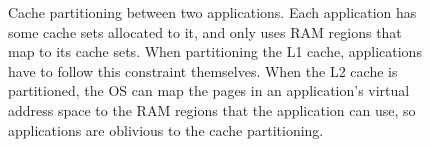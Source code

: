 \begin{figure}[hbt]
  \caption{
    Cache partitioning between two applications. Each application has some
    cache sets allocated to it, and only uses RAM regions that map to its cache
    sets. When partitioning the L1 cache, applications have to follow this
    constraint themselves. When the L2 cache is partitioned, the OS can map the
    pages in an application's virtual address space to the RAM regions that the
    application can use, so applications are oblivious to the cache
    partitioning.
  }
  \label{fig:cache_partitions}
\end{figure}

